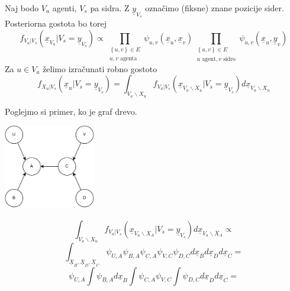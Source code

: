 \documentclass{beamer}
\theoremstyle{definition}
\begin{document}
	\begin{frame}
		Naj bodo $V_a$ agenti, $V_s$ pa sidra.
		Z $\underline{y}_{V_s}$ označimo (fiksne) znane pozicije sider.
		Posteriorna gostota bo torej
		$$
		f_{V_a | V_s}\left(\underline{x}_{V_a} | V_s = \underline{y}_{V_s}\right) \propto
		\prod_{\substack{\left\{u,v\right\} \in E \\ u,v \text{ agenta}}}\psi_{u,v}\left(\underline{x}_u,\underline{x}_v\right)
		\prod_{\substack{\left\{u,v\right\} \in E \\ u\text{ agent}, v \text{ sidro}}}\psi_{u,v}\left(\underline{x}_u,\underline{y}_v\right)
		$$
		\pause
		Za $u \in V_a$ želimo izračunati robno gostoto
		$$
		f_{X_u | V_s}\left(\underline{x}_u | V_s = \underline{y}_{V_s}\right) =
		\int_{V_a\backslash X_u} f_{V_a | V_s}\left(\underline{x}_{V_a\backslash X_u} | V_s = \underline{y}_{V_s}\right)
		d\underline{x}_{V_a\backslash X_u}
		$$
	\end{frame}

	\begin{frame}
		Poglejmo si primer, ko je graf drevo.
		\setlength{\columnsep}{-3.5cm}
		\begin{multicols}{2}
			\includegraphics[width=4cm]{message_passing.pdf}
			\columnbreak{}

			$$
			\int_{V_a\backslash X_u} f_{V_a | V_s}\left(\underline{x}_{V_a\backslash X_A} | V_s = \underline{y}_{V_s}\right)
			d\underline{x}_{V_a\backslash X_A} \propto
			$$
			$$
			\int_{\underline{X}_B,\underline{X}_D,\underline{X}_C} \psi_{U,A} \psi_{B,A} \psi_{C,A} \psi_{V,C} \psi_{D,C}d\underline{x}_Bd\underline{x}_Dd\underline{x}_C =
			$$
			\pause
			$$
			\psi_{U,A} \int \psi_{B,A}d\underline{x}_B \int \psi_{C,A} \psi_{V,C}
			\int \psi_{D,C}d\underline{x}_Dd\underline{x}_C=
			$$
		\end{multicols}
	\end{frame}
\end{document}
